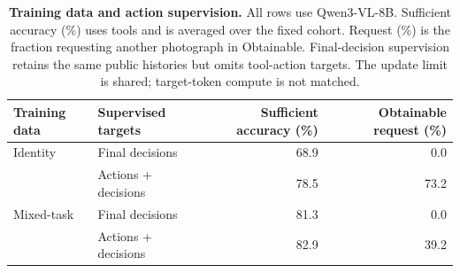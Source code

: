 \begin{table}[t]\centering\small\setlength{\tabcolsep}{5pt}
\begin{minipage}{.72\textwidth}\centering
\caption{\textbf{Training data and action supervision.} All rows use Qwen3-VL-8B.
Sufficient accuracy (\%) uses tools and is averaged over the fixed cohort.
Request (\%) is the fraction requesting another photograph in Obtainable.
Final-decision supervision retains the same public histories but omits tool-action targets.
The update limit is shared; target-token compute is not matched.}
\label{tab:training-ablation}
\begin{tabular}{@{}llrr@{}}\toprule
Training data & Supervised targets & Sufficient accuracy (\%) & Obtainable request (\%)\\\midrule
Identity & Final decisions & 68.9 & 0.0\\
 & Actions + decisions & 78.5 & 73.2\\
\midrule
Mixed-task & Final decisions & 81.3 & 0.0\\
 & Actions + decisions & 82.9 & 39.2\\
\bottomrule
\end{tabular}\end{minipage}\end{table}
